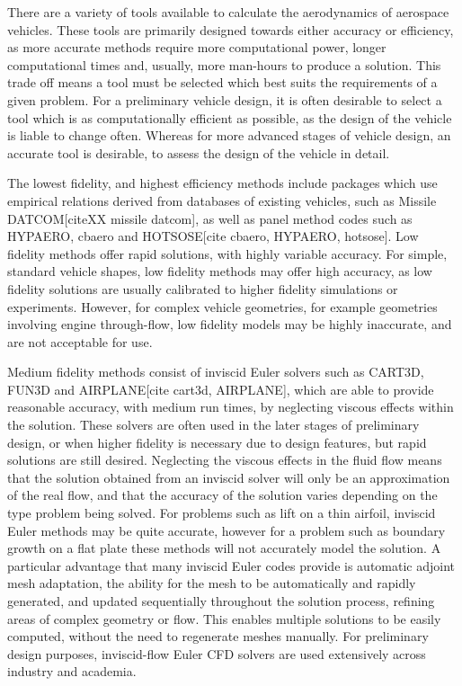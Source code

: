 There are a variety of tools available to calculate the aerodynamics of aerospace vehicles.
 These tools are primarily designed towards either accuracy or efficiency, as more accurate methods require more computational power, longer computational times and, usually, more man-hours to produce a solution. 
This trade off means a tool must be selected which best suits the requirements of a given problem. 
For a preliminary vehicle design, it is often desirable to select a tool which is as computationally efficient as possible, as the design of the vehicle is liable to change often. 
Whereas for more advanced stages of vehicle design, an accurate tool is desirable, to assess the design of the vehicle in detail. 

The lowest fidelity, and highest efficiency methods include packages which use empirical relations derived from databases of existing vehicles, such as Missile DATCOM[citeXX missile datcom], as well as panel method codes such as HYPAERO, cbaero and HOTSOSE[cite cbaero, HYPAERO, hotsose]. Low fidelity methods offer rapid solutions, with highly variable accuracy. For simple, standard vehicle shapes, low fidelity methods may offer high accuracy, as low fidelity solutions are usually calibrated to higher fidelity simulations or experiments. However, for complex vehicle geometries, for example geometries involving engine through-flow, low fidelity models may be highly inaccurate, and are not acceptable for use. 

Medium fidelity methods consist of inviscid Euler solvers such as CART3D, FUN3D and AIRPLANE[cite cart3d, AIRPLANE], which are able to provide reasonable accuracy, with medium run times, by neglecting viscous effects within the solution. These solvers are often used in the later stages of preliminary design, or when higher fidelity is necessary due to design features, but rapid solutions are still desired.  Neglecting the viscous effects in the fluid flow means that the solution obtained from an inviscid solver will only be an approximation of the real flow, and that the accuracy of the solution varies depending on the type problem being solved. For problems such as lift on a thin airfoil, inviscid Euler methods may be quite accurate, however for a problem such as boundary growth on a flat plate these methods will not accurately model the solution. A particular advantage that many inviscid Euler codes provide is automatic adjoint mesh adaptation, the ability for the mesh to be automatically and rapidly generated, and updated sequentially throughout the solution process, refining areas of complex geometry or flow. This enables multiple solutions to be easily computed, without the need to regenerate meshes manually. For preliminary design purposes, inviscid-flow Euler CFD solvers are used extensively across industry and academia\cite{Almosnino2016}. 

